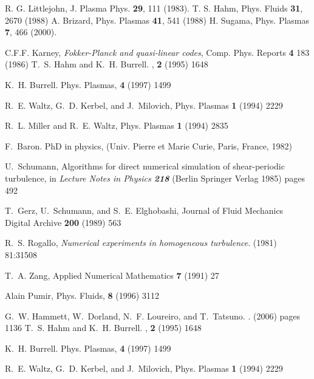 \documentclass{report}
\begin{document}
\begin{thebibliography}{10}


 R. G. Littlejohn, J. Plasma Phys. {\bf 29}, 111 (1983).
 T. S. Hahm, Phys. Fluids {\bf 31}, 2670 (1988)
 A. Brizard, Phys. Plasmas {\bf 41}, 541 (1988)
 H. Sugama, Phys. Plasmas {\bf 7}, 466 (2000).

 C.F.F. Karney, {\sl Fokker-Planck and quasi-linear codes}, Comp. Phys. Reports {\bf 4} 183 
(1986) 
T.~S. Hahm and K.~H. Burrell.
, {\bf 2} (1995) 1648

K.~H. Burrell.
\newblock Phys. Plasmas, {\bf 4} (1997) 1499

R.~E. Waltz, G.~D. Kerbel, and J.~Milovich, Phys. Plasmas {\bf 1} (1994) 2229

R.~L. Miller and R.~E. Waltz, Phys. Plasmas {\bf 1} (1994) 2835

F.~Baron. {PhD} in physics, (Univ. Pierre et Marie Curie, Paris, France, 1982) 

U.~{Schumann}, {Algorithms for direct numerical simulation of shear-periodic
  turbulence}, in {\em Lecture Notes in
  Physics {\bf 218}} (Berlin Springer Verlag 1985) pages 492

T.~Gerz, U.~Schumann, and S.~E. Elghobashi, Journal of Fluid Mechanics Digital Archive {\bf 200} 
(1989) 563

R.~S. {Rogallo}, {\em Numerical experiments in homogeneous turbulence}.
 (1981) 81:31508

T.~A. {Zang}, Applied Numerical Mathematics {\bf 7} (1991) 27

 Alain Pumir, Phys. Fluids, {\bf 8} (1996) 3112

G.~W. {Hammett}, W.~{Dorland}, N.~F. {Loureiro}, and T.~{Tatsuno}.
.
 (2006) pages 1136 %
T.~S. Hahm and K.~H. Burrell.
, {\bf 2} (1995) 1648

K.~H. Burrell.
\newblock Phys. Plasmas, {\bf 4} (1997) 1499

R.~E. Waltz, G.~D. Kerbel, and J.~Milovich, Phys. Plasmas {\bf 1} (1994) 2229


\end{thebibliography}
\end{document}
